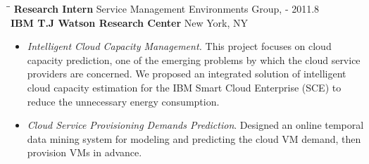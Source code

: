 \documentclass{res}
\begin{document}
\begin{resume}
    \begin{tabbing}
   \hspace{1.6in}\= \hspace{3.3in}\= \kill %
    {\bf Research Intern} \> Service Management Environments Group,    - 2011.8\\
                            \>\textbf {IBM T.J Watson Research Center}        \>New York, NY\\
   \end{tabbing}      %
   \begin{itemize}
   \vspace{-5pt}
    \item \emph{Intelligent Cloud Capacity Management.}
    This project focuses on cloud capacity prediction, one of the emerging problems by which the cloud service providers are concerned. 
	We proposed an integrated solution of intelligent cloud capacity estimation for the IBM Smart Cloud Enterprise (SCE) to reduce the unnecessary energy consumption. %
    \item \emph{Cloud Service Provisioning Demands Prediction}.
	Designed an online temporal data mining system for modeling and predicting the cloud VM demand, then provision VMs in advance. %
   \end{itemize}\vspace{-10pt}



\end{resume}
\end{document}
